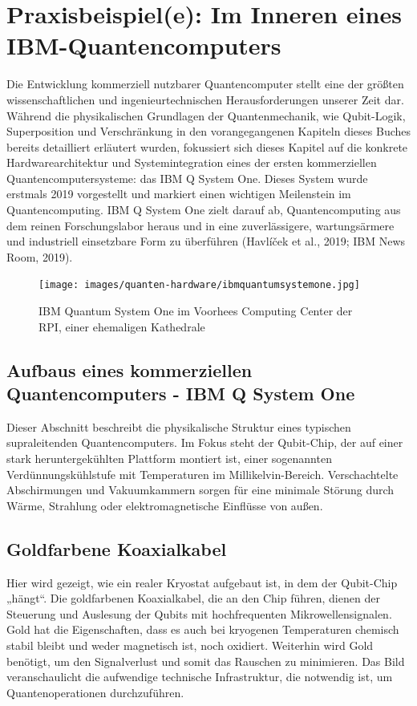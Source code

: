 \section{Praxisbeispiel(e): Im Inneren eines IBM-Quantencomputers}
Die Entwicklung kommerziell nutzbarer Quantencomputer stellt eine der größten wissenschaftlichen und ingenieurtechnischen Herausforderungen unserer Zeit dar. Während die physikalischen Grundlagen der Quantenmechanik, wie Qubit-Logik, Superposition und Verschränkung in den vorangegangenen Kapiteln dieses Buches bereits detailliert erläutert wurden, fokussiert sich dieses Kapitel auf die konkrete Hardwarearchitektur und Systemintegration eines der ersten kommerziellen Quantencomputersysteme: das IBM Q System One. Dieses System wurde erstmals 2019 vorgestellt und markiert einen wichtigen Meilenstein im Quantencomputing. IBM Q System One zielt darauf ab, Quantencomputing aus dem reinen Forschungslabor heraus und in eine zuverlässigere, wartungsärmere und industriell einsetzbare Form zu überführen (Havlíček et al., 2019; IBM News Room, 2019).

\begin{figure}[H]
    \centering
    \texttt{[image: images/quanten-hardware/ibmquantumsystemone.jpg]}
    \caption{IBM Quantum System One im Voorhees Computing Center der RPI, einer ehemaligen Kathedrale}
    \label{fig:ibmquantumsystemone}
\end{figure}

\subsection{Aufbaus eines kommerziellen Quantencomputers - IBM Q System One}
Dieser Abschnitt beschreibt die physikalische Struktur eines typischen supraleitenden Quantencomputers. Im Fokus steht der Qubit-Chip, der auf einer stark heruntergekühlten Plattform montiert ist, einer sogenannten Verdünnungskühlstufe mit Temperaturen im Millikelvin-Bereich. Verschachtelte Abschirmungen und Vakuumkammern sorgen für eine minimale Störung durch Wärme, Strahlung oder elektromagnetische Einflüsse von außen.


\subsection{Goldfarbene Koaxialkabel}
Hier wird gezeigt, wie ein realer Kryostat aufgebaut ist, in dem der Qubit-Chip „hängt“. Die goldfarbenen Koaxialkabel, die an den Chip führen, dienen der Steuerung und Auslesung der Qubits mit hochfrequenten Mikrowellensignalen. Gold hat die Eigenschaften, dass es auch bei kryogenen Temperaturen chemisch stabil bleibt und weder magnetisch ist, noch oxidiert. Weiterhin wird Gold benötigt, um den Signalverlust und somit das Rauschen zu minimieren. Das Bild veranschaulicht die aufwendige technische Infrastruktur, die notwendig ist, um Quantenoperationen durchzuführen.

